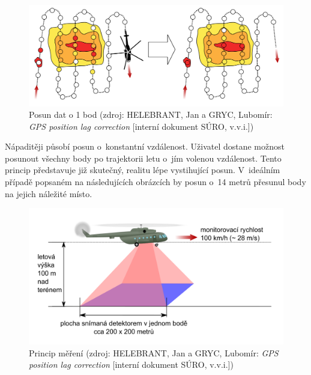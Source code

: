   \begin{figure}[H]
   \centering
	\includegraphics[scale=0.2]{./pictures/posun.png}
	\caption[Posun dat o 1 bod]{Posun dat o 1 bod
	(zdroj: HELEBRANT, Jan a GRYC, Lubomír: \textit{GPS position lag correction} [interní dokument
	SÚRO, v.v.i.])}
      \label{fig:posun}
  \end{figure}

Nápaditěji působí posun o~konstantní vzdálenost. Uživatel dostane možnost posunout všechny body
po trajektorii letu o~jím volenou vzdálenost. Tento princip představuje již skutečný, realitu lépe
vystihující posun. V~ideálním případě popsaném na následujících obrázcích by posun o~14 metrů přesunul
body na jejich náležité místo. 

  \begin{figure}[H]
   \centering
	\includegraphics[scale=0.4]{./pictures/snimani.png}
	\caption[Princip měření]{Princip měření
	(zdroj: HELEBRANT, Jan a GRYC, Lubomír: \textit{GPS position lag correction} [interní dokument
	SÚRO, v.v.i.])}
      \label{fig:mereni}
  \end{figure}
  
